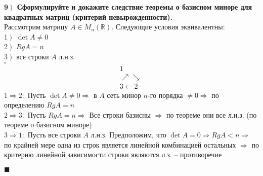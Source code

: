 \documentclass[a4paper,12pt]{article}
\begin{document}
    \textbf{9$\left.\right)$ Сформулируйте и докажите следствие теоремы о базисном миноре для квадратных матриц (критерий невырожденности).}\\ Рассмотрим матрицу $A\in M_n(\mathbb{R})$. Следующие условия эквивалентны:\\
    1$\left.\right)$ $\det A\ne 0$\\
    2$\left.\right)$ $RgA=n$\\
    3$\left.\right)$ все строки $A$ л.н.з.\\
    $\square$\\
    \[\begin{matrix}
          & 1                & \\
          & \nearrow\searrow & \\
          & 3\leftarrow2     &
    \end{matrix}\
    \]
    $1\Rightarrow2:$ Пусть $\det A\ne 0\Rightarrow$ в $A$ сеть минор $n$-го порядка $\ne0\Rightarrow$ по определению $RgA=n$\\
    $2\Rightarrow3:$ Пусть $RgA=n\Rightarrow$ Все строки базисны $\Rightarrow$ по теореме они все л.н.з. (по теореме о базисном миноре)\\
    $3\Rightarrow1:$ Пусть все строки $A$ л.н.з. Предположим, что $\det A=0\Rightarrow RgA<n\Rightarrow$ по крайней мере одна из строк является линейной комбинацией остальных $\Rightarrow$ по критерию линейной зависимости строки являются л.з. -- противоречие
    \begin{flushright}
        $\blacksquare$
    \end{flushright}
\end{document}

